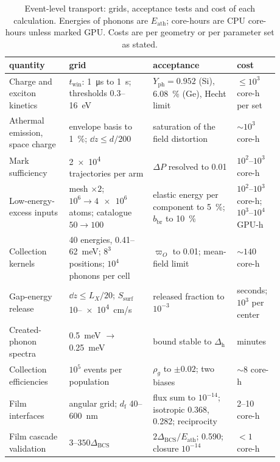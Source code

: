 \begin{table}[t]
  \caption{Event-level transport: grids, acceptance tests and cost of each calculation. Energies of phonons are $E_{\mathrm{ath}}$; core-hours are CPU core-hours unless marked GPU. Costs are per geometry or per parameter set as stated.}
  \label{tab:E25-runs}
  \centering
  \small
  \begin{tabular}{p{0.20\linewidth}p{0.29\linewidth}p{0.28\linewidth}p{0.11\linewidth}}
    \toprule
    quantity & grid & acceptance & cost \\
    \midrule
    Charge and exciton kinetics & $t_{\mathrm{win}}$: \SI{1}{\micro s} to \SI{1}{s}; thresholds 0.3--\SI{16}{eV} & $Y_{\mathrm{ph}} = 0.952$ (Si), \SI{6.08}{\percent} (Ge), Hecht limit & $\le 10^3$ core-h per set \\
    Athermal emission, space charge & envelope basis to \SI{1}{\percent}; $\dd z \le d/200$ & saturation of the field distortion & $\sim 10^3$ core-h \\
    Mark sufficiency & \num{2e4} trajectories per arm & $\Delta P$ resolved to 0.01 & $10^2$--$10^3$ core-h \\
    Low-energy-excess inputs & mesh $\times 2$; $10^6 \to \num{4e6}$ atoms; catalogue $50 \to 100$ & elastic energy per component to \SI{5}{\percent}; $b_{\mathrm{br}}$ to \SI{10}{\percent} & $10^2$--$10^3$ core-h; $10^3$--$10^4$ GPU-h \\
    Collection kernels & 40 energies, 0.41--\SI{62}{meV}; $8^3$ positions; $10^4$ phonons per cell & $\varpi_O$ to 0.01; mean-field limit & $\sim 140$ core-h \\
    Gap-energy release & $\dd z \le L_X/20$; $S_{\mathrm{surf}}$ 10--\SI{e4}{cm/s} & released fraction to $10^{-3}$ & seconds; $10^3$ per center \\
    Created-phonon spectra & \SI{0.5}{meV} $\to$ \SI{0.25}{meV} & bound stable to $\Delta_{\mathrm{h}}$ & minutes \\
    Collection efficiencies & $10^5$ events per population & $\rho_g$ to $\pm 0.02$; two biases & $\sim 8$ core-h \\
    Film interfaces & angular grid; $d_{\mathrm{f}}$ 40--\SI{600}{nm} & flux sum to $10^{-14}$; isotropic 0.368, 0.282; reciprocity & 2--10 core-h \\
    Film cascade validation & 3--$350\Delta_{\mathrm{BCS}}$ & $2\Delta_{\mathrm{BCS}}/E_{\mathrm{ath}}$; 0.590; closure $10^{-14}$ & $< 1$ core-h \\
    \bottomrule
  \end{tabular}
\end{table}
